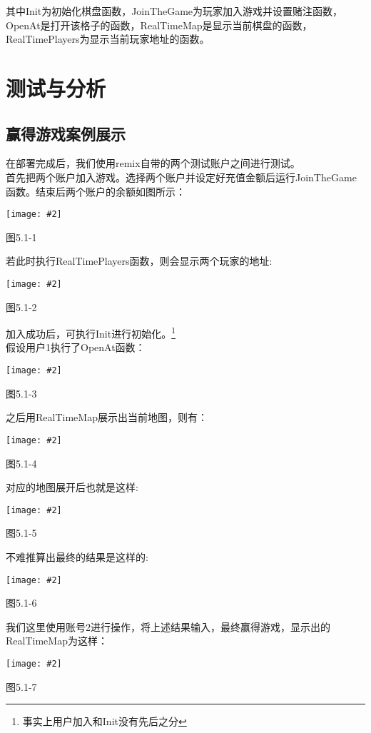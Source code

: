 \documentclass[UTF8]{ctexart}
\newcommand\picturehere[2][1]{\centerline{\texttt{[image: \#2]}}}
\begin{document}
	\indent 其中Init为初始化棋盘函数，JoinTheGame为玩家加入游戏并设置赌注函数，OpenAt是打开该格子的函数，RealTimeMap是显示当前棋盘的函数，RealTimePlayers为显示当前玩家地址的函数。\\
	\newpage
  \section{测试与分析}
	\subsection{赢得游戏案例展示}

	\indent 在部署完成后，我们使用remix自带的两个测试账户之间进行测试。\\
	\indent 首先把两个账户加入游戏。选择两个账户并设定好充值金额后运行JoinTheGame函数。结束后两个账户的余额如图所示：\\
	\picturehere[1.5]{s10.png}
	\begin{center} 图5.1-1 \end{center} %

	\indent 若此时执行RealTimePlayers函数，则会显示两个玩家的地址:\\
	\picturehere[1]{s11.png}
	\begin{center} 图5.1-2 \end{center} %

	\indent 加入成功后，可执行Init进行初始化。\footnote[1]{事实上用户加入和Init没有先后之分}\\
	\indent 假设用户1执行了OpenAt函数：\\
	\picturehere[1]{s12.png}
	\begin{center} 图5.1-3 \end{center} %

	\indent 之后用RealTimeMap展示出当前地图，则有：\\
	\picturehere[1]{s16.png}
	\begin{center} 图5.1-4 \end{center} %
	\newpage
	\indent 对应的地图展开后也就是这样:\\
	\picturehere[1]{s17.png}
	\begin{center} 图5.1-5 \end{center} %

	\indent 不难推算出最终的结果是这样的:\\
	\picturehere[1]{s19.png}
	\begin{center} 图5.1-6 \end{center} %

	\indent 我们这里使用账号2进行操作，将上述结果输入，最终赢得游戏，显示出的RealTimeMap为这样：\\
	\picturehere[1]{s18.png}
	\begin{center} 图5.1-7 \end{center} %
\end{document}
